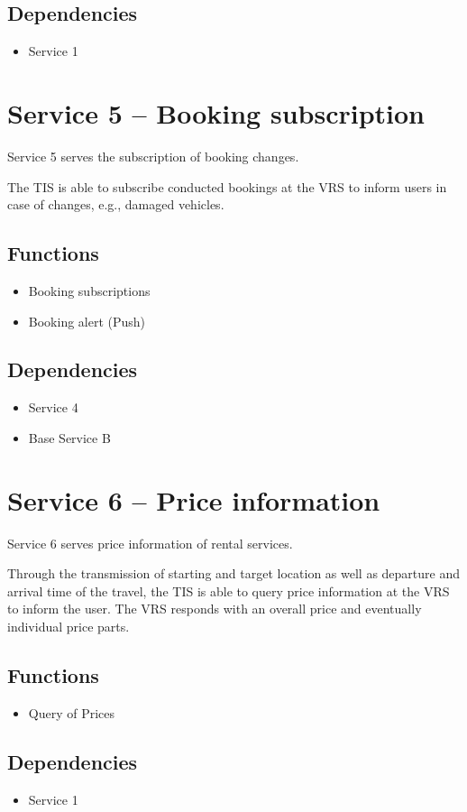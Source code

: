 \subsection*{Dependencies}
\begin{itemize}
\item Service 1
\end{itemize}

\section{Service 5 -- Booking subscription}
\label{sec:Hierachiemodell:Dienst5}
Service 5 serves the subscription of booking changes.

The TIS is able to subscribe conducted bookings at the VRS to inform users in case of changes, e.g., damaged vehicles.
\subsection*{Functions}
\begin{itemize}
\item Booking subscriptions 
\item Booking alert (Push)
\end{itemize}

\subsection*{Dependencies}
\begin{itemize}
\item Service 4
\item Base Service B
\end{itemize}

\section{Service 6 -- Price information}
\label{sec:Hierachiemodell:Dienst6}
Service 6 serves price information of rental services.

Through the transmission of starting and target location as well as departure and arrival time of the travel, the TIS is able to query price information at the VRS to inform the user. The VRS responds with an overall price and eventually individual price parts.

\subsection*{Functions}
\begin{itemize}
\item Query of Prices
\end{itemize}

\subsection*{Dependencies}
\begin{itemize}
\item Service 1
\end{itemize}


